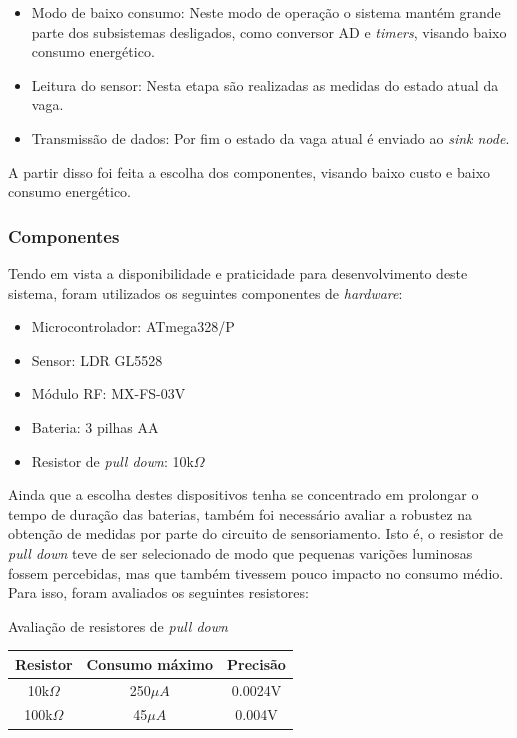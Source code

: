 \documentclass[oneside,openright,12pt]{ufsm_2015} %
\begin{document}
    \begin{itemize}
        \item Modo de baixo consumo: Neste modo de operação o sistema mantém grande parte dos subsistemas desligados, como conversor AD e \textit{timers}, visando baixo consumo energético.
        \item Leitura do sensor: Nesta etapa são realizadas as medidas do estado atual da vaga.
        \item Transmissão de dados: Por fim o estado da vaga atual é enviado ao \textit{sink node}.
        
    \end{itemize}
    
    A partir disso foi feita a escolha dos componentes, visando baixo custo e baixo consumo energético.
    
    \subsubsection{Componentes}
    Tendo em vista a disponibilidade e praticidade para desenvolvimento deste sistema, foram utilizados os seguintes componentes de \textit{hardware}:
    \begin{itemize}
        \item Microcontrolador: ATmega328/P
        \item Sensor: LDR GL5528 
        \item Módulo RF: MX-FS-03V
        \item Bateria: 3 pilhas AA
        \item Resistor de \textit{pull down}: 10k$\Omega$
    \end{itemize}
    
    Ainda que a escolha destes dispositivos tenha se concentrado em prolongar o tempo de duração das baterias, também foi necessário avaliar a robustez na obtenção de medidas por parte do circuito de sensoriamento. Isto é, o resistor de \textit{pull down} teve de ser selecionado de modo que pequenas varições luminosas fossem percebidas, mas que também tivessem pouco impacto no consumo médio. Para isso, foram avaliados os seguintes resistores:
    
    \begin{quadro}\label{quadro:resistores-pd}
   	    \caption{Avaliação de resistores de \textit{pull down}}
	    \centering
	    \begin{tabular}{| c |c |c |}
	    \hline
	    Resistor & Consumo máximo & Precisão \\
	    \hline
	    10k$\Omega$ & 250$\mu A$ & 0.0024V\\
	    \hline
	    100k$\Omega$ & 45$\mu A$ & 0.004V\\
	    \hline
	    \end{tabular}
	    \vspace{\baselineskip} %
    \end{quadro}
    
\end{document}
